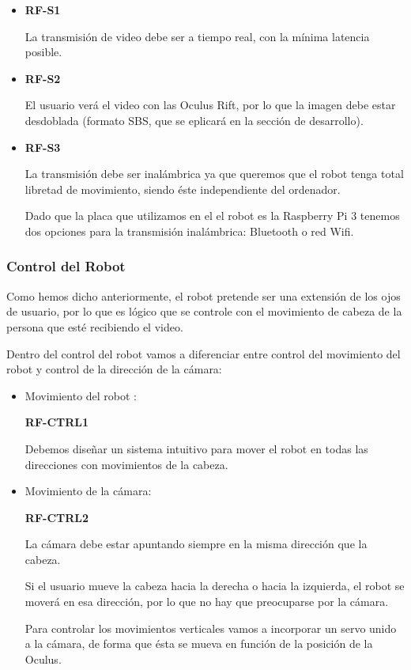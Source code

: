 \documentclass[twoside, 12pt]{epstfg}
\begin{document}
\begin{itemize}
	\item\textbf{RF-S1}
	
	La transmisión de video debe ser  a tiempo real, con la mínima latencia posible.
	
	\item\textbf{RF-S2}
	
	El usuario verá el video con  las Oculus Rift, por lo que la imagen debe estar desdoblada (formato SBS, que se eplicará en la sección de desarrollo).
	
	\item\textbf{RF-S3}
	
	La transmisión debe ser inalámbrica ya que queremos que el robot tenga total libretad de movimiento, siendo éste independiente del ordenador.
	
	
	Dado que la placa que utilizamos en el el robot es la Raspberry Pi 3 tenemos dos opciones para la transmisión inalámbrica: Bluetooth o red Wifi.
	
\end{itemize}



\subsubsection{Control del Robot}

Como hemos dicho anteriormente, el robot pretende ser una extensión de los ojos de usuario, por lo que es lógico que se controle con el movimiento de cabeza de la persona que esté recibiendo el video.

Dentro del control del robot vamos a diferenciar entre control del movimiento del robot y control de la dirección de la cámara:

\begin{itemize}
	\item Movimiento del robot :
	
	\textbf{RF-CTRL1}
	
	Debemos diseñar un sistema intuitivo para mover el robot en todas las direcciones con movimientos de la cabeza.
	\item  Movimiento de la cámara:
	
	\textbf{RF-CTRL2}
	
	La cámara debe estar apuntando siempre en la misma dirección que la cabeza.
	
	Si el usuario mueve la cabeza hacia la derecha o hacia la izquierda, el robot se moverá en esa dirección, por lo que no hay que preocuparse por la cámara.
	
	Para controlar los movimientos verticales vamos a incorporar un servo unido a la cámara, de forma que ésta se mueva en función de la posición de la Oculus. 
\end{itemize}
\end{document}
